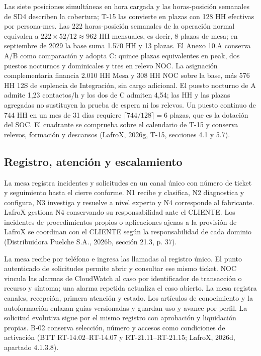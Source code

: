 Las siete posiciones simultáneas en hora cargada y las horas-posición semanales de SD4 describen la cobertura; T-15 las convierte en plazas con 128 HH efectivas por persona-mes. Las 222 horas-posición semanales de la operación normal equivalen a $222\times52/12\approx962$ HH mensuales, es decir, 8 plazas de mesa; en septiembre de 2029 la base suma 1.570 HH y 13 plazas. El Anexo 10.A conserva A/B como comparación y adopta C: quince plazas equivalentes en peak, dos puestos nocturnos y dominicales y tres en relevo NOC. La asignación complementaria financia 2.010 HH Mesa y 308 HH NOC sobre la base, más 576 HH 12S de suplencia de Integración, sin cargo adicional. El puesto nocturno de A admite 1,23 contactos/h y los dos de C admiten 4,54; las HH y las plazas agregadas no sustituyen la prueba de espera ni los relevos. Un puesto continuo de 744 HH en un mes de 31 días requiere $\lceil744/128\rceil=6$ plazas, que es la dotación del SOC. El cuadrante se comprueba sobre el calendario de T-15 y conserva relevos, formación y descansos (LafroX, 2026g, T-15, secciones 4.1 y 5.7).

\subsection{Registro, atención y escalamiento}
\label{sub:sd10-incidentes}

La mesa registra incidentes y solicitudes en un canal único con número de ticket y seguimiento hasta el cierre conforme. N1 recibe y clasifica, N2 diagnostica y configura, N3 investiga y resuelve a nivel experto y N4 corresponde al fabricante. LafroX gestiona N4 conservando su responsabilidad ante el CLIENTE. Los incidentes de procedimientos propios o aplicaciones ajenas a la provisión de LafroX se coordinan con el CLIENTE según la responsabilidad de cada dominio (Distribuidora Puelche S.A., 2026b, sección 21.3, p. 37).

La mesa recibe por teléfono e ingresa las llamadas al registro único. El punto autenticado de solicitudes permite abrir y consultar ese mismo ticket. NOC vincula las alarmas de CloudWatch al caso por identificador de transacción o recurso y síntoma; una alarma repetida actualiza el caso abierto. La mesa registra canales, recepción, primera atención y estado. Los artículos de conocimiento y la autoformación enlazan guías versionadas y guardan uso y avance por perfil. La solicitud evolutiva sigue por el mismo registro con aprobación y liquidación propias. B-02 conserva selección, número y accesos como condiciones de activación (BTT RT-14.02--RT-14.07 y RT-21.11--RT-21.15; LafroX, 2026d, apartado 4.1.3.8).


